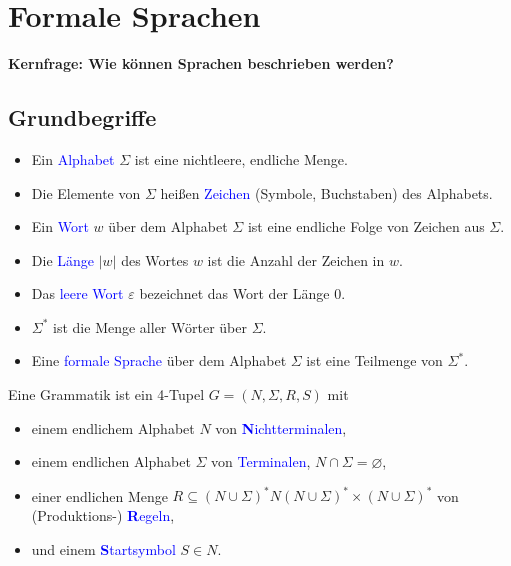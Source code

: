 \documentclass{scrreprt}
\begin{document}
\chapter{Formale Sprachen}
\textbf{Kernfrage: Wie können Sprachen beschrieben werden?}

\section{Grundbegriffe}

\begin{Definition}
\noindent
\begin{itemize}
\item
Ein \textcolor{blue}{Alphabet} $\Sigma$ ist eine nichtleere, endliche Menge.
\item
Die Elemente von $\Sigma$ heißen \textcolor{blue}{Zeichen} (Symbole, Buchstaben) des Alphabets.
\item
Ein \textcolor{blue}{Wort} $w$ über dem Alphabet $\Sigma$ ist eine endliche Folge von Zeichen aus $\Sigma$.
\item
Die \textcolor{blue}{Länge} $|w|$ des Wortes $w$ ist die Anzahl der Zeichen in $w$.
\item
Das \textcolor{blue}{leere Wort} $\varepsilon$ bezeichnet das Wort der Länge $0$.
\item
$\Sigma^*$ ist die Menge aller Wörter über $\Sigma$.
\item
Eine \textcolor{blue}{formale Sprache} über dem Alphabet $\Sigma$ ist eine Teilmenge von $\Sigma^*$.
\end{itemize}
\end{Definition}

\begin{Definition}[Grammatik]
Eine Grammatik ist ein 4-Tupel $G=(N,\Sigma,R,S)$ mit
\noindent
\begin{itemize}
\item
einem endlichem Alphabet $N$ von \textcolor{blue}{\textbf{N}ichtterminalen},
\item
einem endlichen Alphabet $\Sigma$ von \textcolor{blue}{Terminalen}, $N\cap \Sigma = \varnothing$,
\item
einer endlichen Menge $R \subseteq (N \cup \Sigma)^* N (N \cup \Sigma)^* \times (N \cup \Sigma)^*$ von (Produktions-) \textcolor{blue}{\textbf{R}egeln},
\item
und einem \textcolor{blue}{\textbf{S}tartsymbol} $S\in N$.
\end{itemize}
\end{Definition}
\end{document}
